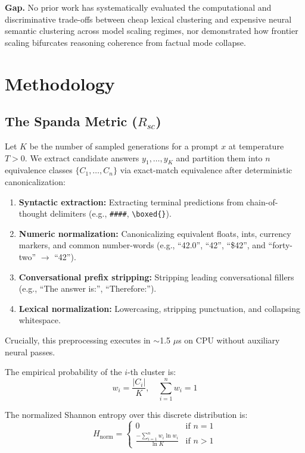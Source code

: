 \documentclass[11pt]{article}
\begin{document}
\textbf{Gap.} No prior work has systematically evaluated the computational and discriminative trade-offs between cheap lexical clustering and expensive neural semantic clustering across model scaling regimes, nor demonstrated how frontier scaling bifurcates reasoning coherence from factual mode collapse.

\section{Methodology}

\subsection{The Spanda Metric ($R_{sc}$)}

Let $K$ be the number of sampled generations for a prompt $x$ at temperature $T > 0$. We extract candidate answers $y_1, \dots, y_K$ and partition them into $n$ equivalence classes $\{C_1, \dots, C_n\}$ via exact-match equivalence after deterministic canonicalization:
\begin{enumerate}
    \item \textbf{Syntactic extraction:} Extracting terminal predictions from chain-of-thought delimiters (e.g., \texttt{\#\#\#\#}, \texttt{\textbackslash boxed\{\}}).
    \item \textbf{Numeric normalization:} Canonicalizing equivalent floats, ints, currency markers, and common number-words (e.g., ``42.0'', ``42'', ``\$42'', and ``forty-two'' $\to$ ``42'').
    \item \textbf{Conversational prefix stripping:} Stripping leading conversational fillers (e.g., ``The answer is:'', ``Therefore:'').
    \item \textbf{Lexical normalization:} Lowercasing, stripping punctuation, and collapsing whitespace.
\end{enumerate}
Crucially, this preprocessing executes in $\sim$1.5 $\mu$s on CPU without auxiliary neural passes.

The empirical probability of the $i$-th cluster is:
\begin{equation}
    w_i = \frac{|C_i|}{K}, \quad \sum_{i=1}^{n} w_i = 1
\end{equation}

The normalized Shannon entropy over this discrete distribution is:
\begin{equation}
    H_{\text{norm}} = \begin{cases}
        0 & \text{if } n = 1 \\
        \displaystyle\frac{-\sum_{i=1}^{n} w_i \ln w_i}{\ln K} & \text{if } n > 1
    \end{cases}
\end{equation}
\end{document}
